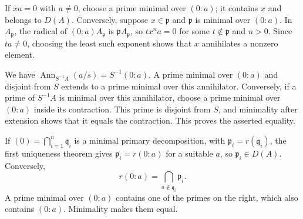 If $xa=0$ with $a\ne0$, choose a prime minimal over $(0:a)$; it contains $x$ and belongs to $D(A)$. Conversely, suppose $x\in\mathfrak{p}$ and $\mathfrak{p}$ is minimal over $(0:a)$. In $A_{\mathfrak{p}}$, the radical of $(0:a)A_{\mathfrak{p}}$ is $\mathfrak{p}A_{\mathfrak{p}}$, so $tx^na=0$ for some $t\notin\mathfrak{p}$ and $n>0$. Since $ta\ne0$, choosing the least such exponent shows that $x$ annihilates a nonzero element.

We have $\operatorname{Ann}_{S^{-1}A}(a/s)=S^{-1}(0:a)$. A prime minimal over $(0:a)$ and disjoint from $S$ extends to a prime minimal over this annihilator. Conversely, if a prime of $S^{-1}A$ is minimal over this annihilator, choose a prime minimal over $(0:a)$ inside its contraction. This prime is disjoint from $S$, and minimality after extension shows that it equals the contraction. This proves the asserted equality.

If $(0)=\bigcap_{i=1}^n\mathfrak{q}_i$ is a minimal primary decomposition, with $\mathfrak{p}_i=r(\mathfrak{q}_i)$, the first uniqueness theorem gives $\mathfrak{p}_i=r(0:a)$ for a suitable $a$, so $\mathfrak{p}_i\in D(A)$. Conversely,
\[r(0:a)=\bigcap_{a\notin\mathfrak{q}_i}\mathfrak{p}_i.\]
A prime minimal over $(0:a)$ contains one of the primes on the right, which also contains $(0:a)$. Minimality makes them equal.
